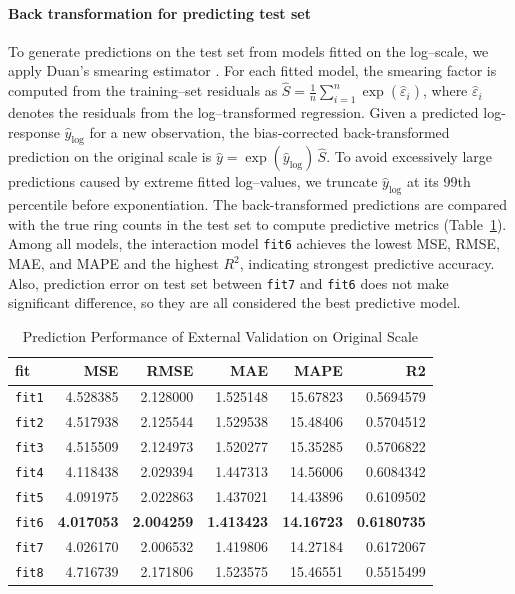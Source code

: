 \documentclass[12pt]{article}
\begin{document}
	\paragraph{Back transformation for predicting test set} To generate predictions on the test set from models fitted on the log--scale, we apply 
	Duan's smearing estimator \cite{duan1983smearing}. 
	For each fitted model, the smearing factor is computed from the training--set residuals as $\hat{S}=\frac{1}{n}\sum_{i=1}^{n}\exp(\hat{\varepsilon}_i)$, where $\hat{\varepsilon}_i$ denotes the residuals from the log--transformed regression. Given a predicted log-response $\widehat{y}_{\log}$ for a new observation, the bias-corrected back-transformed prediction on the original scale is $\widehat{y} = \exp(\widehat{y}_{\log}) \, \hat{S}.$ To avoid excessively large predictions caused by extreme fitted log--values, we truncate  	$\widehat{y}_{\log}$ at its 99th percentile before exponentiation. The back-transformed predictions are compared with the true ring counts in the test set to compute predictive metrics (Table~\ref{tab:final_evaluation}). Among all models, the interaction model \texttt{fit6} achieves the lowest MSE, RMSE, MAE, and MAPE and the highest $R^2$, indicating strongest predictive accuracy. Also, prediction error on test set between \texttt{fit7} and \texttt{fit6} does not make significant difference, so they are all considered the best predictive model.
	
	
	\begin{table}[H]
		\centering
		\caption{\label{tab:final_evaluation}Prediction Performance of External Validation on Original Scale}
		\begin{tabular}{lrrrrr}
			\toprule
			\textbf{fit} & \textbf{MSE} & \textbf{RMSE} & \textbf{MAE} & \textbf{MAPE} & \textbf{R2} \\
			\midrule
			\texttt{fit1} & 4.528385 & 2.128000 & 1.525148 & 15.67823 & 0.5694579 \\
			\texttt{fit2} & 4.517938 & 2.125544 & 1.529538 & 15.48406 & 0.5704512 \\
			\texttt{fit3} & 4.515509 & 2.124973 & 1.520277 & 15.35285 & 0.5706822 \\
			\texttt{fit4} & 4.118438 & 2.029394 & 1.447313 & 14.56006 & 0.6084342 \\
			\texttt{fit5} & 4.091975 & 2.022863 & 1.437021 & 14.43896 & 0.6109502 \\
			\texttt{fit6} & \textbf{4.017053} & \textbf{2.004259} & \textbf{1.413423} & \textbf{14.16723} & \textbf{0.6180735} \\
			\texttt{fit7} & 4.026170 & 2.006532 & 1.419806 & 14.27184 & 0.6172067 \\
			\texttt{fit8} & 4.716739 & 2.171806 & 1.523575 & 15.46551 & 0.5515499 \\
			\bottomrule
		\end{tabular}
	\end{table}
	
\end{document}
